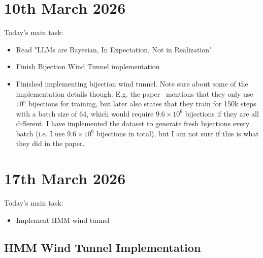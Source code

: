 \documentclass[12pt,a4paper,twoside]{article}
\begin{document}
\section{10th March 2026}

\begin{summary}
	Today's main task:
	\begin{itemize}
		\item Read "LLMs are Bayesian, In Expectation, Not in Realization"~\cite{Chlon2025}
		\item Finish Bijection Wind Tunnel implementation
	\end{itemize}
\end{summary}

\begin{note}
	\begin{itemize}
		\item Finished implementing bijection wind tunnel. Note sure about some of the implementation details though. E.g. the paper~\cite{Agarwal2026} mentions that they only use $10^5$ bijections for training, but later also states that they train for 150k steps with a batch size of 64, which would require $9.6\times 10^6$ bijections if they are all different. I have implemented the dataset to generate fresh bijections every batch (i.e. I use $9.6\times 10^6$ bijections in total), but I am not sure if this is what they did in the paper.
	\end{itemize}
\end{note}

\section{17th March 2026}

\begin{summary}
	Today's main task:
	\begin{itemize}
		\item Implement HMM wind tunnel
	\end{itemize}
\end{summary}

\subsection{HMM Wind Tunnel Implementation}
\end{document}
